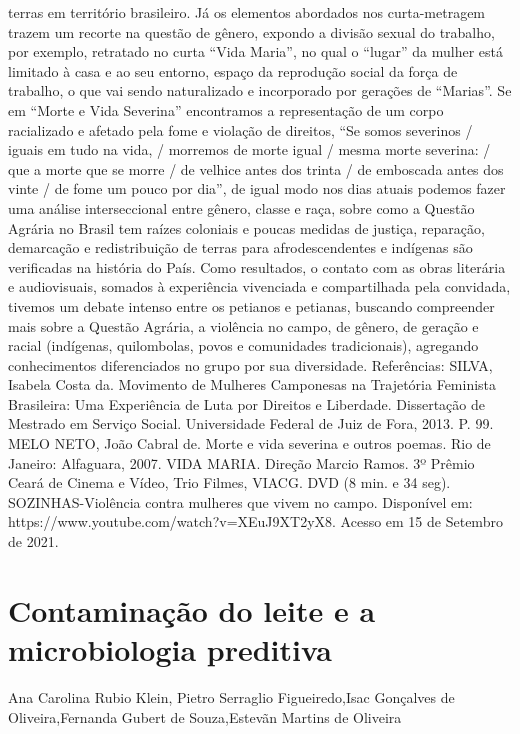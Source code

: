 terras em território brasileiro. Já os elementos abordados nos curta-metragem trazem um recorte 
na questão de gênero, expondo a divisão sexual do trabalho, por exemplo, retratado no curta “Vida 
Maria”, no qual o “lugar” da mulher está limitado à casa e ao seu entorno, espaço da reprodução 
social da força de trabalho, o que vai sendo naturalizado e incorporado por gerações de “Marias”.
Se em “Morte e Vida Severina” encontramos a representação de um corpo racializado e 
afetado pela fome e violação de direitos, “Se somos severinos / iguais em tudo na vida, / morremos 
de morte igual / mesma morte severina: / que a morte que se morre / de velhice antes dos trinta / 
de emboscada antes dos vinte / de fome um pouco por dia”, de igual modo nos dias atuais podemos 
fazer uma análise interseccional entre gênero, classe e raça, sobre como a Questão Agrária no 
Brasil tem raízes coloniais e poucas medidas de justiça, reparação, demarcação e redistribuição de 
terras para afrodescendentes e indígenas são verificadas na história do País.
Como resultados, o contato com as obras literária e audiovisuais, somados à experiência 
vivenciada e compartilhada pela convidada, tivemos um debate intenso entre os petianos e 
petianas, buscando compreender mais sobre a Questão Agrária, a violência no campo, de gênero, 
de geração e racial (indígenas, quilombolas, povos e comunidades tradicionais), agregando 
conhecimentos diferenciados no grupo por sua diversidade. 
Referências:
SILVA, Isabela Costa da. Movimento de Mulheres Camponesas na Trajetória Feminista 
Brasileira: Uma Experiência de Luta por Direitos e Liberdade. Dissertação de Mestrado em 
Serviço Social. Universidade Federal de Juiz de Fora, 2013. P. 99.
MELO NETO, João Cabral de. Morte e vida severina e outros poemas. Rio de Janeiro: Alfaguara, 
2007.
VIDA MARIA. Direção Marcio Ramos. 3º Prêmio Ceará de Cinema e Vídeo, Trio Filmes, 
VIACG. DVD (8 min. e 34 seg).
SOZINHAS-Violência contra mulheres que vivem no campo. Disponível em: 
https://www.youtube.com/watch?v=XEuJ9XT2yX8. Acesso em 15 de Setembro de 2021.



\section{Contaminação do leite e a microbiologia preditiva}

Ana Carolina Rubio Klein, Pietro Serraglio Figueiredo,Isac Gonçalves de Oliveira,Fernanda Gubert de Souza,Estevãn Martins de Oliveira

